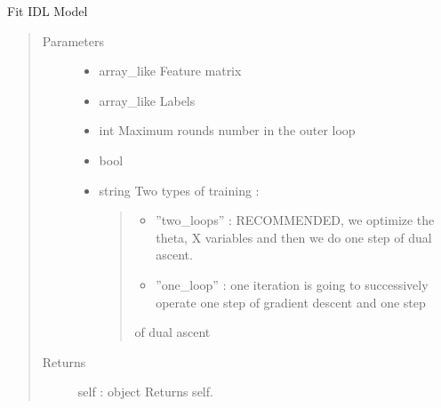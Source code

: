 \documentclass[letterpaper,10pt,english]{sphinxmanual}
\begin{document}
\begin{fulllineitems}
\begin{description}
\end{description}

\begin{fulllineitems}
\label{\detokenize{sections/learning:IDL.IDLModel.fit}}
Fit IDL Model
\begin{quote}\begin{description}
\item[{Parameters}] \leavevmode\begin{itemize}
\item {} 
 \textendash{} array\_like
Feature matrix

\item {} 
 \textendash{} array\_like
Labels

\item {} 
 \textendash{} int
Maximum rounds number in the outer loop

\item {} 
 \textendash{} bool

\item {} 
 \textendash{} 
string
Two types of training :
\begin{quote}
\begin{itemize}
\item {} 
”two\_loops” : RECOMMENDED, we optimize the theta, X variables and then we do one step of dual ascent.

\item {} 
”one\_loop” : one iteration is going to successively operate one step of gradient descent and one step

\end{itemize}

of dual ascent
\end{quote}


\end{itemize}

\item[{Returns}] \leavevmode
self : object
Returns self.

\end{description}\end{quote}

\end{fulllineitems}


\end{fulllineitems}
\end{document}
